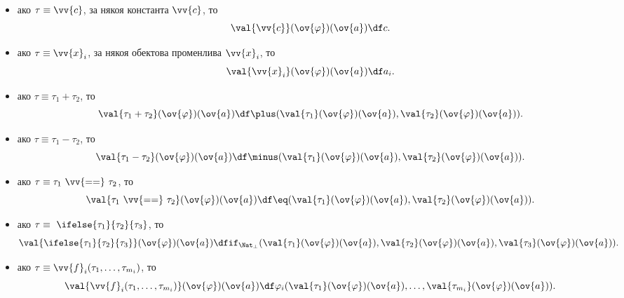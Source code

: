 \begin{itemize}
\item
  ако $\tau \equiv \vv{c}$, за някоя константа $\vv{c}$, то 
  \[\val{\vv{c}}(\ov{\varphi})(\ov{a}) \df c.\]
\item
  ако $\tau \equiv \vv{x}_i$, за някоя обектова променлива $\vv{x}_i$, то 
  \[\val{\vv{x}_i}(\ov{\varphi})(\ov{a}) \df a_i.\]
\item
  ако $\tau \equiv \tau_1 + \tau_2$, то
  \[\val{\tau_1 + \tau_2}(\ov{\varphi})(\ov{a}) \df \plus(\val{\tau_1}(\ov{\varphi})(\ov{a}), \val{\tau_2}(\ov{\varphi})(\ov{a})).\]
\item
  ако $\tau \equiv \tau_1 - \tau_2$, то
  \[\val{\tau_1 - \tau_2}(\ov{\varphi})(\ov{a}) \df \minus(\val{\tau_1}(\ov{\varphi})(\ov{a}), \val{\tau_2}(\ov{\varphi})(\ov{a})).\]

\item
  ако $\tau \equiv \tau_1\ \vv{==}\ \tau_2$, то
  \[\val{\tau_1\ \vv{==}\ \tau_2}(\ov{\varphi})(\ov{a}) \df \eq(\val{\tau_1}(\ov{\varphi})(\ov{a}), \val{\tau_2}(\ov{\varphi})(\ov{a})).\]

\item
  ако $\tau \equiv\ \ifelse{\tau_1}{\tau_2}{\tau_3}$, то
  \[\val{\ifelse{\tau_1}{\tau_2}{\tau_3}}(\ov{\varphi})(\ov{a}) \df \texttt{if}_{\Nat_\bot}(\val{\tau_1}(\ov{\varphi})(\ov{a}), \val{\tau_2}(\ov{\varphi})(\ov{a}), \val{\tau_3}(\ov{\varphi})(\ov{a})).\]

\item
  ако $\tau \equiv \vv{f}_i(\tau_1,\dots,\tau_{m_i})$, то
  \[\val{\vv{f}_i(\tau_1,\dots,\tau_{m_i})}(\ov{\varphi})(\ov{a}) \df \varphi_i(\val{\tau_1}(\ov{\varphi})(\ov{a}),\dots,\val{\tau_{m_i}}(\ov{\varphi})(\ov{a})).\]

\end{itemize}



